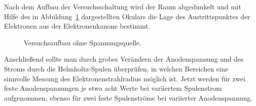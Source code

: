 Nach dem Aufbau der Versuchsschaltung wird der Raum abgedunkelt und mit Hilfe des in Abbildung~\ref{fig:Aufbau} dargestellten Okulars die Lage des Austrittspunktes der Elektronen aus der Elektronenkanone bestimmt. 
\begin{figure}[htb]
\begin{center}
\def\svgwidth{8cm}

\end{center}
\caption{Versuchsaufbau ohne Spannungsquelle. \citep{LP-Spulen}}
\label{fig:Aufbau}
\end{figure}
Anschließend sollte man durch grobes Verändern der Anodenspannung und des Stroms durch die Helmholtz-Spulen überprüfen, in welchen Bereichen eine sinnvolle Messung des Elektronenstrahlradius möglich ist.
Jetzt werden für zwei feste Anodenspannungen je etwa acht Werte bei variiertem Spulenstrom aufgenommen, ebenso für zwei feste Spulenströme bei variierter Anodenspannung.
